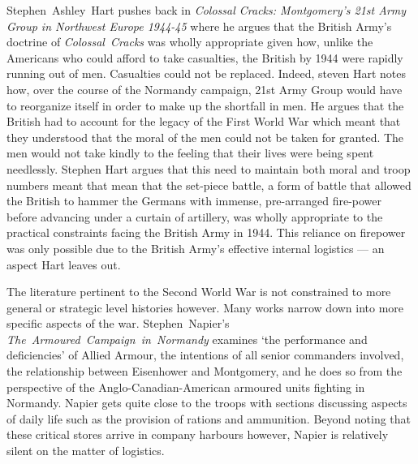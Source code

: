 \documentclass[noraggedright]{turabian-researchpaper}
\begin{document}

\mbox{Stephen Ashley Hart}  pushes back in \textit{Colossal Cracks:  
Montgomery's 21st Army Group in Northwest Europe 1944-45} where he
argues that the British Army's doctrine of \mbox{\textit{Colossal Cracks}} was 
wholly appropriate given how, unlike the Americans who could afford to take 
casualties, the British by 1944 were rapidly 
running out of men.  Casualties could not be replaced.\autocite[5]
{cracks} Indeed, steven Hart notes how, over
the course of the Normandy campaign, 21st Army Group would have to reorganize
itself in order to make up the shortfall in men.\autocite[58 -- 60, 63 -- 5]
{cracks}
He argues that the British had to account for the legacy of the 
First World War which meant that they understood that the moral of the men 
could not be taken for granted.  The men would not take kindly to the feeling 
that their lives were being spent needlessly.\autocite[27]{cracks}
Stephen Hart argues that this need to maintain both moral and troop numbers 
meant that mean that the set-piece battle, a form of battle that allowed the 
British to hammer the Germans with immense, pre-arranged fire-power before 
advancing under a curtain of artillery, was wholly appropriate to the 
practical constraints facing the British Army in 1944.\autocite[6 -- 7]
{cracks} This reliance on firepower was only possible due to 
the British Army's effective internal logistics --- an aspect Hart leaves 
out. 

The literature pertinent to the Second World War is not constrained to more
general or strategic level histories however.  Many works narrow down into 
more specific aspects of the war.  \mbox{Stephen Napier's} \mbox{\textit{The 
Armoured Campaign in Normandy}} examines `the performance and deficiencies' 
of Allied Armour, the intentions of all senior commanders involved, the 
relationship between Eisenhower and Montgomery, and he does so from the 
perspective of the Anglo-Canadian-American armoured units fighting in 
Normandy.  %
Napier gets quite close to the troops with sections discussing aspects of 
daily life such as the provision of rations and ammunition.\autocite[94 -- 5]
{armoured} Beyond noting that these critical stores arrive in company 
harbours however, Napier is relatively silent on the matter of logistics.
\end{document}
